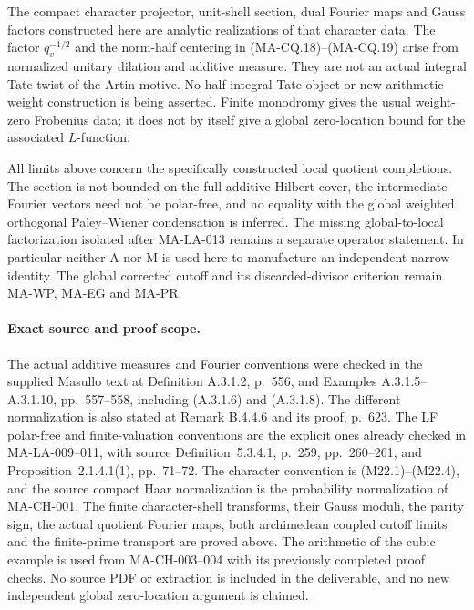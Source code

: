 The compact character projector, unit-shell section,
dual Fourier maps and Gauss factors constructed here
are analytic realizations of that character data.
The factor $q_v^{-1/2}$ and the norm-half centering
in (MA-CQ.18)--(MA-CQ.19) arise from normalized
unitary dilation and additive measure.
They are not an actual integral Tate twist of
the Artin motive.  No half-integral Tate object
or new arithmetic weight construction is being
asserted.  Finite monodromy gives the usual
weight-zero Frobenius data; it does not by itself
give a global zero-location bound for the
associated $L$-function.

All limits above concern the specifically constructed
local quotient completions.  The section is not
bounded on the full additive Hilbert cover, the
intermediate Fourier vectors need not be polar-free,
and no equality with the global weighted orthogonal
Paley--Wiener condensation is inferred.
The missing global-to-local factorization isolated
after MA-LA-013 remains a separate operator statement.
In particular neither A nor M is used here to
manufacture an independent narrow identity.
The global corrected cutoff and its discarded-divisor
criterion remain MA-WP, MA-EG and MA-PR.

\paragraph{Exact source and proof scope.}
The actual additive measures and Fourier conventions
were checked in the supplied Masullo text at Definition
A.3.1.2, p.~556, and Examples A.3.1.5--A.3.1.10,
pp.~557--558, including (A.3.1.6) and (A.3.1.8).
The different normalization is also stated at
Remark B.4.4.6 and its proof, p.~623.
The LF polar-free and finite-valuation conventions
are the explicit ones already checked in MA-LA-009--011,
with source Definition~5.3.4.1, p.~259,
pp.~260--261, and Proposition~2.1.4.1(1),
pp.~71--72.
The character convention is (M22.1)--(M22.4),
and the source compact Haar normalization is the
probability normalization of MA-CH-001.
The finite character-shell transforms, their
Gauss moduli, the parity sign, the actual
quotient Fourier maps, both archimedean
coupled cutoff limits and the finite-prime
transport are proved above.
The arithmetic of the cubic example is used
from MA-CH-003--004 with its previously
completed proof checks.
No source PDF or extraction is included in
the deliverable, and no new independent
global zero-location argument is claimed.

